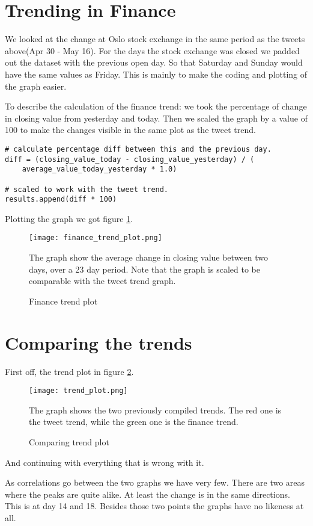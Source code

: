 \section{Trending in Finance}\label{trend:trends_in_finance}
We looked at the change at Oslo stock exchange in the same period as the tweets
above(Apr 30 - May 16). For the days the stock exchange was closed we padded out
the dataset with the previous open day. So that Saturday and Sunday would have
the same values as Friday. This is mainly to make the coding and plotting of
the graph easier. 

To describe the calculation of the finance trend: we took the percentage of
change in closing value from yesterday and today. Then we scaled the graph by a
value of 100 to make the changes visible in the same plot as the tweet trend.
\begin{verbatim}
# calculate percentage diff between this and the previous day.
diff = (closing_value_today - closing_value_yesterday) / (
    average_value_today_yesterday * 1.0)

# scaled to work with the tweet trend.
results.append(diff * 100)
\end{verbatim}

Plotting the graph we got figure \ref{fig:trend_finance_plot}.
\begin{figure}[htb]
    \centering
    \texttt{[image: finance\_trend\_plot.png]}
    \label{fig:trend_finance_plot}
    \caption{Finance trend plot}
The graph show the average change in closing value between two days, over a 23 day period. Note that the graph is scaled to be comparable with the tweet trend graph. 
\end{figure}
%

\section{Comparing the trends}\label{trend:compared}
First off, the trend plot in figure \ref{fig:trend_plot}. 
\begin{figure}[htb]
    \centering
    \texttt{[image: trend\_plot.png]}
    \label{fig:trend_plot}
    \caption{Comparing trend plot}
The graph shows the two previously compiled trends. The red one is the tweet
trend, while the green one is the finance trend.  
\end{figure}

And continuing with everything that is wrong with it. 

As correlations go between the two graphs we have very few. There are two areas
where the peaks are quite alike. At least the change is in the same directions.
This is at day 14 and 18. Besides those two points the graphs have no likeness
at all.  

